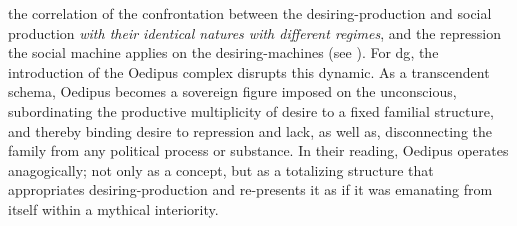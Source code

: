 the correlation of the confrontation between the desiring-production and
social production \textit{with their identical natures with different
	regimes}, and the repression the social machine applies on the
desiring-machines (see \cite[54]{deleuze1983}). For \gls{dg}, the introduction of the Oedipus complex disrupts this dynamic. As a transcendent schema, Oedipus becomes a sovereign figure imposed on the unconscious, subordinating the productive multiplicity of desire to a fixed familial structure, and thereby binding desire to repression and lack, as well as, disconnecting the family from any political process or substance. In their reading, Oedipus operates anagogically; not only as a concept, but as a totalizing structure that appropriates desiring-production and re-presents it as if it was emanating from itself within a mythical interiority.

